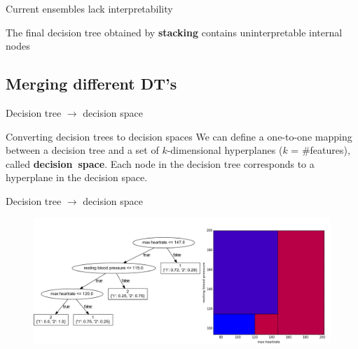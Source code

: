 \documentclass[english]{beamer}
\begin{document}
\begin{frame}{Current ensembles lack interpretability}
	\begin{block}{}
		The final decision tree obtained by \textbf{stacking} contains uninterpretable internal nodes
	\end{block}
	
	\vspace{2em}
	
	
\end{frame}

\subsection*{Merging different DT's}

\begin{frame}{Decision tree $\rightarrow$ decision space}
	\begin{block}{Converting decision trees to decision spaces}
		We can define a one-to-one mapping between a decision tree and a set of $k$-dimensional hyperplanes ($k$ = $\#$features), called \textbf{decision~space}.	Each node in the decision tree corresponds to a hyperplane in the decision space.
	\end{block}
\end{frame}

\begin{frame}{Decision tree $\rightarrow$ decision space}
	\begin{figure}
		\centering
		\includegraphics[width=\textwidth]{figures/dt_to_space.pdf}
	\end{figure}
\end{frame}
\end{document}
